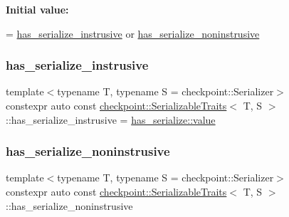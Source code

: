 {\bfseries Initial value\+:}
\begin{DoxyCode}
=
    \hyperlink{structcheckpoint_1_1_serializable_traits_a9e6855e572198a99854e9e8d2ac8b9d7}{has\_serialize\_instrusive} or 
      \hyperlink{structcheckpoint_1_1_serializable_traits_a2b02dea52e9cce1e6ec8e251c414e2e5}{has\_serialize\_noninstrusive}
\end{DoxyCode}
\mbox{\label{structcheckpoint_1_1_serializable_traits_a9e6855e572198a99854e9e8d2ac8b9d7}} 
\subsubsection{\texorpdfstring{has\+\_\+serialize\+\_\+instrusive}{has\_serialize\_instrusive}}
{\footnotesize\ttfamily template$<$typename T, typename S = checkpoint\+::\+Serializer$>$ \\
constexpr auto const \hyperlink{structcheckpoint_1_1_serializable_traits}{checkpoint\+::\+Serializable\+Traits}$<$ T, S $>$\+::has\+\_\+serialize\+\_\+instrusive = \hyperlink{structdetection_1_1detector_a6d7d0e1bdf5903db9edbe448edccf83b}{has\+\_\+serialize\+::value}\hspace{0.3cm}{\ttfamily [static]}}

\mbox{\label{structcheckpoint_1_1_serializable_traits_a2b02dea52e9cce1e6ec8e251c414e2e5}} 
\subsubsection{\texorpdfstring{has\+\_\+serialize\+\_\+noninstrusive}{has\_serialize\_noninstrusive}}
{\footnotesize\ttfamily template$<$typename T, typename S = checkpoint\+::\+Serializer$>$ \\
constexpr auto const \hyperlink{structcheckpoint_1_1_serializable_traits}{checkpoint\+::\+Serializable\+Traits}$<$ T, S $>$\+::has\+\_\+serialize\+\_\+noninstrusive\hspace{0.3cm}{\ttfamily [static]}}

